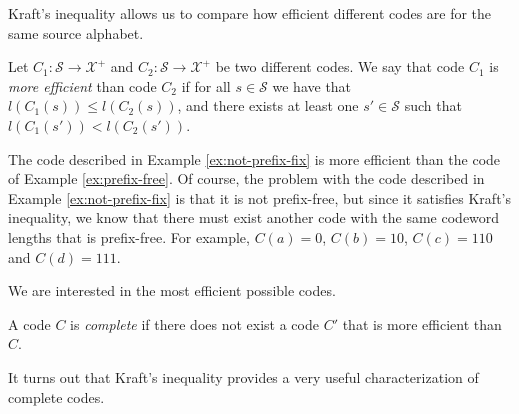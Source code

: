 Kraft's inequality allows us to compare how efficient different codes are for the same source alphabet.

\begin{definition}
Let $C_1:\mathcal{S}\rightarrow\mathcal{X}^{+}$ and $C_2:\mathcal{S}\rightarrow\mathcal{X}^{+}$ be two different codes. We say that code $C_1$ is \emph{more efficient} than code $C_2$ if for all $s \in \mathcal{S}$ we have that $l(C_1(s)) \leq l(C_2(s))$, and there exists at least one $s' \in \mathcal{S}$ such that $l(C_1(s')) < l(C_2(s'))$.
\end{definition}

\begin{example}
The code described in Example \ref{ex:not-prefix-fix} is more efficient than the code of Example \ref{ex:prefix-free}. Of course, the problem with the code described in Example \ref{ex:not-prefix-fix} is that it is not prefix-free, but since it satisfies Kraft's inequality, we know that there must exist another code with the same codeword lengths that is prefix-free. For example, $C(a)=0$, $C(b)=10$, $C(c)=110$ and $C(d)=111$.
\end{example}

We are interested in the most efficient possible codes.

\begin{definition}
A code $C$ is \emph{complete} if there does not exist a code $C'$ that is more efficient than $C$.
\end{definition}

It turns out that Kraft's inequality provides a very useful characterization of complete codes.

